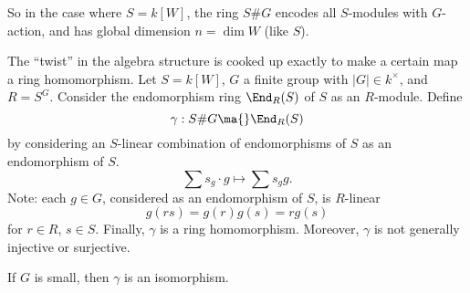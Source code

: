 So in the case where $S= k[W]$, the ring $S\#G$ encodes all $S$-modules with $G$-action, and has global dimension $n= \dim W$ (like $S$). 

The ``twist'' in the algebra structure is cooked up exactly to make a certain map a ring homomorphism. Let $S= k[W]$, $G$ a finite group with $|G| \in k^\times$, and $R= S^G$. Consider the endomorphism ring $\End_R(S)$ of $S$ as an $R$-module. Define
	\[
	\gamma: S\#G \ma{} \End_R(S)
	\]
by considering an $S$-linear combination of endomorphisms of $S$ as an endomorphism of $S$. 
	\[
	\sum s_g \cdot g \mapsto \sum s_g g.
	\]
Note: each $g \in G$, considered as an endomorphism of $S$, is $R$-linear
	\[
	g(rs)= g(r) g(s) = rg(s)
	\]
for $r \in R$, $s \in S$. Finally, $\gamma$ is a ring homomorphism. Moreover, $\gamma$ is not generally injective or surjective.

\begin{thm}[Auslander, 62]
If $G$ is small, then $\gamma$ is an isomorphism.
\end{thm}

































